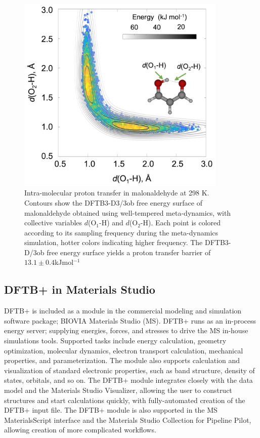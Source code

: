 \documentclass{revtex4-1}
\newcommand{\dftbp}{DFTB+}
\begin{document}
\begin{figure}[htbp]
  \centering
  \includegraphics[width=10cm]{mtdfigure.png}
  \caption{Intra-molecular proton transfer in malonaldehyde at 298 K. Contours
    show the DFTB3-D3/3ob free energy surface of malonaldehyde obtained using
    well-tempered meta-dynamics, with collective variables $d$(O$_{1}$-H) and
    $d$(O$_{2}$-H). Each point is colored according to its sampling frequency
    during the meta-dynamics simulation, hotter colors indicating higher
    frequency.  The DFTB3-D/3ob free energy surface yields a proton transfer
    barrier of $13.1 \pm 0.4$\;kJ\;mol$^{-1}$}
  \label{fig:mtd}
\end{figure}

\subsection{\dftbp{} in Materials Studio}

\dftbp{} is included as a module in the commercial modeling and simulation
software package; BIOVIA Materials Studio (MS).\cite{BIOVIA-MS} \dftbp{} runs as
an in-process energy server; supplying energies, forces, and stresses to drive
the MS in-house simulations tools. Supported tasks include energy calculation,
geometry optimization, molecular dynamics, electron transport calculation,
mechanical properties, and parameterization. The module also supports
calculation and visualization of standard electronic properties, such as band
structure, density of states, orbitals, and so on. The \dftbp{} module
integrates closely with the data model and the Materials Studio Visualizer,
allowing the user to construct structures and start calculations quickly, with
fully-automated creation of the \dftbp{} input file.  The \dftbp{} module is
also supported in the MS MaterialsScript interface and the Materials Studio
Collection for Pipeline Pilot,\cite{BIOVIA-MSC} allowing creation of more
complicated workflows.\cite{C7RA04120A,C6CP03987A}
\end{document}

